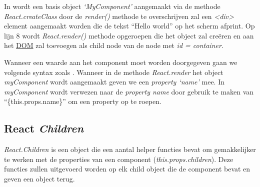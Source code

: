 		
		In  wordt een basis object \emph{`MyComponent'} aangemaakt via de methode \emph{React.createClass} door de \emph{render()} methode te overschrijven zal een \emph{<div>} element aangemaakt worden die de tekst ``Hello world'' op het scherm afprint. Op lijn 8 wordt \emph{React.render()} methode opgeroepen die het object zal creëren en aan het \hyperref[dom]{DOM} zal toevoegen als child node van de node met \emph{id = container}.
		
		Wanneer een waarde aan het component moet worden doorgegeven gaan we volgende syntax zoals . Wanneer in de methode \emph{React.render} het object \emph{myComponent} wordt aangemaakt geven we een \emph{property `name'} mee. In \emph{myComponent} wordt verwezen naar de \emph{property name} door gebruik te maken van ``\{this.props.name\}'' om een property op te roepen.
		
		

	
	\subsection{React \emph{Children}}
		
		\emph{React.Children} is een object die een aantal helper functies bevat om gemakkelijker te werken met de properties van een component (\emph{this.props.children}). Deze functies zullen uitgevoerd worden op elk child object die de component bevat en geven een object terug.
		
